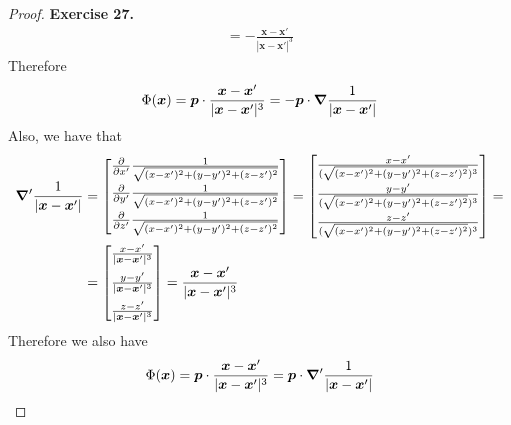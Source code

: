 \documentclass[11pt]{article}
\theoremstyle{definition}
\begin{document}
\begin{proof}{\textbf{Exercise 27.}}
\begin{align*}
    = -\frac{\bm{x}- \bm{x}'}{|\bm{x}- \bm{x}'|^3}
\end{align*}
Therefore
\begin{align*}
    \Phi(\bm{x}) = \bm{p} \cdot \frac{\bm{x} - \bm{x}'}{|\bm{x} - \bm{x}'|^3}
    = -\bm{p} \cdot \grad \frac{1}{|\bm{x} - \bm{x}'|} 
\end{align*}
Also, we have that
\begin{align*}
    \grad' \frac{1}{|\bm{x} - \bm{x}'|} &= \begin{bmatrix}
        \pdv{x'}\frac{1}{\sqrt{(x - x')^2 + (y - y')^2 + (z - z')^2}}\\[7pt]
        \pdv{y'}\frac{1}{\sqrt{(x - x')^2 + (y - y')^2 + (z - z')^2}}\\[7pt]
        \pdv{z'}\frac{1}{\sqrt{(x - x')^2 + (y - y')^2 + (z - z')^2}}
    \end{bmatrix}
    = \begin{bmatrix}
        \frac{x - x'}{(\sqrt{(x - x')^2 + (y - y')^2 + (z - z')^2})^3}\\[7pt]
        \frac{y - y'}{(\sqrt{(x - x')^2 + (y - y')^2 + (z - z')^2})^3}\\[7pt]
        \frac{z - z'}{(\sqrt{(x - x')^2 + (y - y')^2 + (z - z')^2})^3}
    \end{bmatrix} = \\
    &= \begin{bmatrix}
        \frac{x - x'}{|\bm{x}- \bm{x}'|^3}\\[7pt]
        \frac{y - y'}{|\bm{x}- \bm{x}'|^3}\\[7pt]
        \frac{z - z'}{|\bm{x}- \bm{x}'|^3}
    \end{bmatrix}
    = \frac{\bm{x}- \bm{x}'}{|\bm{x}- \bm{x}'|^3}
\end{align*}
Therefore we also have
\begin{align*}
    \Phi(\bm{x}) = \bm{p} \cdot \frac{\bm{x} - \bm{x}'}{|\bm{x} - \bm{x}'|^3}
    = \bm{p} \cdot \grad' \frac{1}{|\bm{x} - \bm{x}'|} 
\end{align*}
\end{proof}
\end{document}
